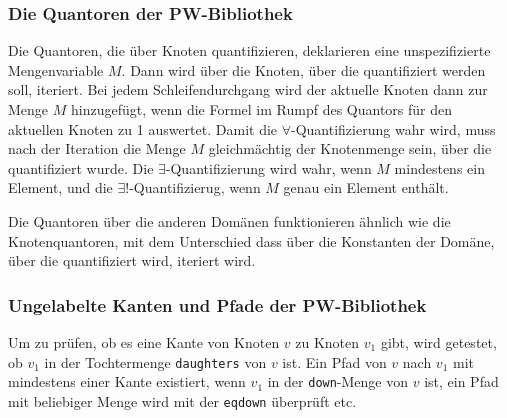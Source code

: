 \subsubsection{Die Quantoren der PW-Bibliothek}

Die Quantoren, die \"uber Knoten quantifizieren, deklarieren eine
unspezifizierte Mengenvariable $M$. Dann wird \"uber die Knoten,
\"uber die quantifiziert werden soll, iteriert. Bei jedem
Schleifendurchgang wird der aktuelle Knoten dann zur Menge $M$
hinzugef\"ugt, wenn die Formel im Rumpf des Quantors f\"ur den
aktuellen Knoten zu 1 auswertet.  Damit die $\forall$-Quantifizierung
wahr wird, muss nach der Iteration die Menge $M$ gleichm\"achtig der
Knotenmenge sein, \"uber die quantifiziert wurde.  Die
$\exists$-Quantifizierung wird wahr, wenn $M$ mindestens ein Element,
und die $\exists!$-Quantifizierug, wenn $M$ genau ein Element
enth\"alt. 

Die Quantoren \"uber die anderen Dom\"anen funktionieren \"ahnlich wie
die Knotenquantoren, mit dem Unterschied dass \"uber die Konstanten
der Dom\"ane, \"uber die quantifiziert wird, iteriert wird.

\subsubsection{Ungelabelte Kanten und Pfade der PW-Bibliothek}

Um zu pr\"ufen, ob es eine Kante von Knoten $v$ zu Knoten $v_1$ gibt,
wird getestet, ob $v_1$ in der Tochtermenge {\tt daughters} von $v$
ist. Ein Pfad von $v$ nach $v_1$ mit mindestens einer Kante existiert,
wenn $v_1$ in der {\tt down}-Menge von $v$ ist, ein Pfad mit
beliebiger Menge wird mit der {\tt eqdown} \"uberpr\"uft etc.
